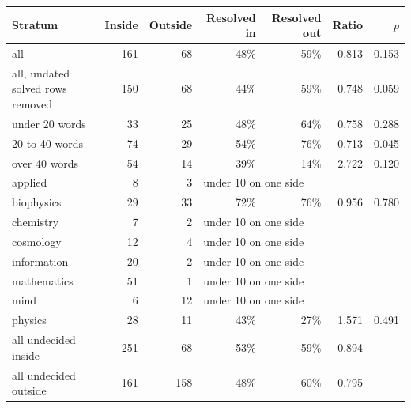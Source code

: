 \begin{tabular}{@{}lrrrrrr@{}}
\toprule
Stratum & Inside & Outside & Resolved in & Resolved out & Ratio & $p$ \\
\midrule
all & 161 & 68 & 48\% & 59\% & 0.813 & 0.153 \\
all, undated solved rows removed & 150 & 68 & 44\% & 59\% & 0.748 & 0.059 \\
under 20 words & 33 & 25 & 48\% & 64\% & 0.758 & 0.288 \\
20 to 40 words & 74 & 29 & 54\% & 76\% & 0.713 & 0.045 \\
over 40 words & 54 & 14 & 39\% & 14\% & 2.722 & 0.120 \\
applied & 8 & 3 & \multicolumn{4}{l}{under 10 on one side} \\
biophysics & 29 & 33 & 72\% & 76\% & 0.956 & 0.780 \\
chemistry & 7 & 2 & \multicolumn{4}{l}{under 10 on one side} \\
cosmology & 12 & 4 & \multicolumn{4}{l}{under 10 on one side} \\
information & 20 & 2 & \multicolumn{4}{l}{under 10 on one side} \\
mathematics & 51 & 1 & \multicolumn{4}{l}{under 10 on one side} \\
mind & 6 & 12 & \multicolumn{4}{l}{under 10 on one side} \\
physics & 28 & 11 & 43\% & 27\% & 1.571 & 0.491 \\
\midrule
all undecided inside & 251 & 68 & 53\% & 59\% & 0.894 & \\
all undecided outside & 161 & 158 & 48\% & 60\% & 0.795 & \\
\bottomrule
\end{tabular}
